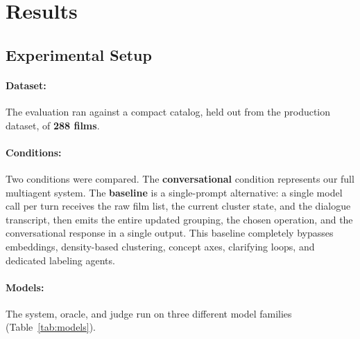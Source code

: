 \section{Results}\label{sec:results}

\subsection{Experimental Setup}

\paragraph{Dataset:} The evaluation ran against a compact catalog, held out from the production dataset, of \textbf{288 films}.

\paragraph{Conditions:} Two conditions were compared.
The \textbf{conversational} condition represents our full multiagent system.
The \textbf{baseline} is a single-prompt alternative: a single model call per turn receives the raw film list, the current cluster state, and the dialogue transcript, then emits the entire updated grouping, the chosen operation, and the conversational response in a single output.
This baseline completely bypasses embeddings, density-based clustering, concept axes, clarifying loops, and dedicated labeling agents.

\paragraph{Models:} The system, oracle, and judge run on three different model families (Table~\ref{tab:models}).

\begin{table}[H]
  \centering
  \caption{Model assignment.}
  \label{tab:models}
\end{table}

